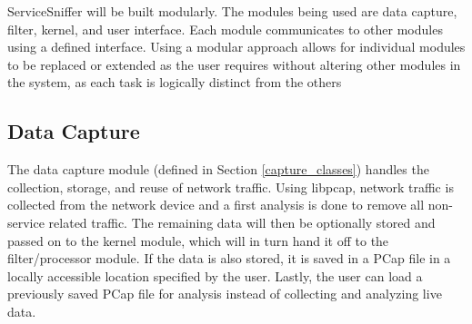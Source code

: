 \documentclass[titlepage]{article}
\begin{document}
% 
% 
% 


ServiceSniffer will be built modularly.  The modules being used are data
capture, filter, kernel, and user interface.  Each module communicates to other
modules using a defined interface.  Using a modular approach allows for
individual modules to be replaced or extended as the user requires without
altering other modules in the system, as each task is logically distinct from
the others

\subsection{Data Capture}

The data capture module (defined in Section \ref{capture_classes}) handles the
collection, storage, and reuse of network traffic.  Using libpcap, network
traffic is collected from the network device and a first analysis is done to
remove all non-service related traffic.  The remaining data will then be
optionally stored and passed on to the kernel module, which will in turn hand
it off to the filter/processor module.  If the data is also stored, it is saved
in a PCap file in a locally accessible location specified by the user.  Lastly,
the user can load a previously saved PCap file for analysis instead of
collecting and analyzing live data.
\end{document}
